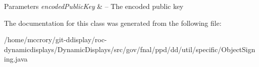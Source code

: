 \begin{DoxyParams}{Parameters}
{\em encoded\-Public\-Key} & -- The encoded public key \\
\hline
\end{DoxyParams}


The documentation for this class was generated from the following file\-:\begin{DoxyCompactItemize}
\item 
/home/mccrory/git-\/ddisplay/roc-\/dynamicdisplays/\-Dynamic\-Displays/src/gov/fnal/ppd/dd/util/specific/Object\-Signing.\-java\end{DoxyCompactItemize}
